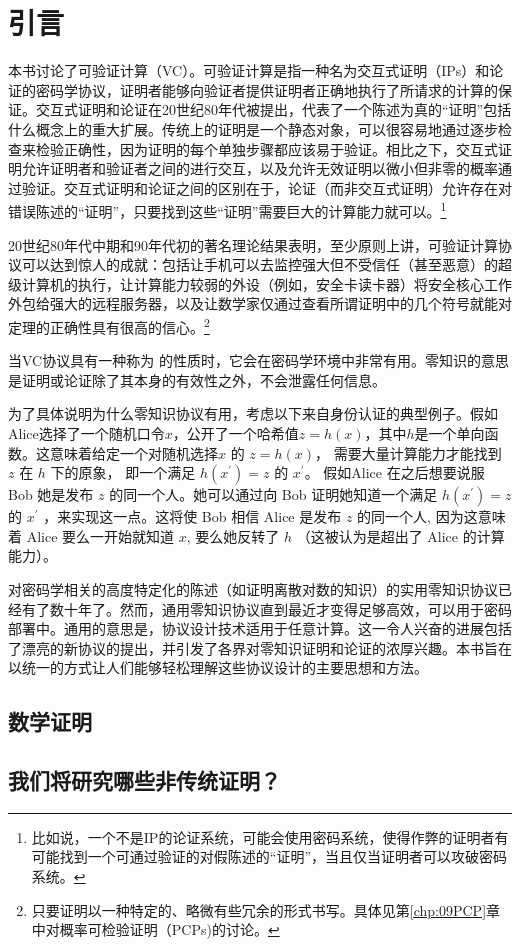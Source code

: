 
\chapter{引言}\label{chp:01Introduction}


本书讨论了可验证计算（VC）。可验证计算是指一种名为交互式证明（IPs）和论证的密码学协议，证明者能够向验证者提供证明者正确地执行了所请求的计算的保证。交互式证明和论证在20世纪80年代被提出，代表了一个陈述为真的“证明”包括什么概念上的重大扩展。传统上的证明是一个静态对象，可以很容易地通过逐步检查来检验正确性，因为证明的每个单独步骤都应该易于验证。相比之下，交互式证明允许证明者和验证者之间的进行交互，以及允许无效证明以微小但非零的概率通过验证。交互式证明和论证之间的区别在于，论证（而非交互式证明）允许存在对错误陈述的“证明”，只要找到这些“证明”需要巨大的计算能力就可以。\footnote{比如说，一个不是IP的论证系统，可能会使用密码系统，使得作弊的证明者有可能找到一个可通过验证的对假陈述的“证明”，当且仅当证明者可以攻破密码系统。}

20世纪80年代中期和90年代初的著名理论结果表明，至少原则上讲，可验证计算协议可以达到惊人的成就：包括让手机可以去监控强大但不受信任（甚至恶意）的超级计算机的执行，让计算能力较弱的外设（例如，安全卡读卡器）将安全核心工作外包给强大的远程服务器，以及让数学家仅通过查看所谓证明中的几个符号就能对定理的正确性具有很高的信心。\footnote{只要证明以一种特定的、略微有些冗余的形式书写。具体见第\ref{chp:09PCP}章中对概率可检验证明（PCPs)的讨论。}


当VC协议具有一种称为 的性质时，它会在密码学环境中非常有用。零知识的意思是证明或论证除了其本身的有效性之外，不会泄露任何信息。

为了具体说明为什么零知识协议有用，考虑以下来自身份认证的典型例子。假如Alice选择了一个随机口令$x$，公开了一个哈希值$z=h(x)$，其中$h$是一个单向函数。这意味着给定一个对随机选择$x$ 的 $z=h(x)$， 需要大量计算能力才能找到 $z$ 在 $h$ 下的原象， 即一个满足 $h\left(x^{\prime}\right)=z$ 的 $x^{\prime}$。 假如Alice 在之后想要说服 Bob 她是发布 $z$ 的同一个人。她可以通过向 Bob 证明她知道一个满足 $h\left(x^{\prime}\right)=z$ 的 $x^{\prime}$ ，来实现这一点。这将使 Bob 相信 Alice 是发布 $z$ 的同一个人, 因为这意味着 Alice 要么一开始就知道 $x$, 要么她反转了 $h$ （这被认为是超出了 Alice 的计算能力）。



对密码学相关的高度特定化的陈述（如证明离散对数的知识\cite{Sch89}）的实用零知识协议已经有了数十年了。然而，通用零知识协议直到最近才变得足够高效，可以用于密码部署中。通用的意思是，协议设计技术适用于任意计算。这一令人兴奋的进展包括了漂亮的新协议的提出，并引发了各界对零知识证明和论证的浓厚兴趣。本书旨在以统一的方式让人们能够轻松理解这些协议设计的主要思想和方法。



\section{数学证明}
\section{我们将研究哪些非传统证明？}